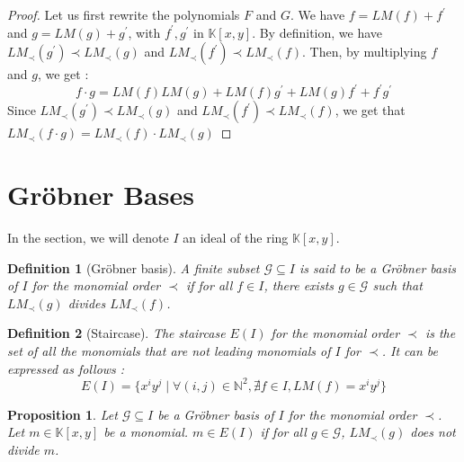 \documentclass{article}
\newtheorem{definition}{Definition}[section]
\newtheorem{proposition}{Proposition}[section]
\begin{document}
\begin{proof}
    Let us first rewrite the polynomials $F$ and $G$. We have $f = LM(f) + f^{\prime}$ and $g = LM(g) + g^{\prime}$, with $f^{\prime}, g^{\prime}$ in $\mathbb{K}[x, y]$. By definition, we have  $LM_{\prec}(g^{\prime}) \prec LM_{\prec}(g)$ and $LM_{\prec}(f^{\prime}) \prec LM_{\prec}(f)$. Then, by multiplying $f$ and $g$, we get :
    \begin{displaymath}
        f \cdot g = LM(f)LM(g) + LM(f)g^{\prime} + LM(g)f^{\prime} + f^{\prime}g^{\prime}
    \end{displaymath}
    Since $LM_{\prec}(g^{\prime}) \prec LM_{\prec}(g)$ and $LM_{\prec}(f^{\prime}) \prec LM_{\prec}(f)$, we get that $LM_{\prec}(f \cdot g) = LM_{\prec}(f) \cdot LM_{\prec}(g)$ 
\end{proof}

\section{Gröbner Bases}

In the section, we will denote $I$ an ideal of the ring $\mathbb{K}[x, y]$. 


\begin{definition}[Gröbner basis]
    A finite subset $\mathscr{G} \subseteq I$ is said to be a Gröbner basis of $I$ for the monomial order $\prec$ if for all $f \in I$, there exists $g \in \mathscr{G}$ such that $LM_{\prec}(g)$ divides $LM_{\prec}(f)$. 
\end{definition}

\begin{definition}[Staircase]
    The staircase $E(I)$ for the monomial order $\prec$ is the set of all the monomials that are not leading monomials of $I$ for $\prec$. It can be expressed as follows : 
    \begin{displaymath}
        E(I) = \{ x^{i}y^{j} \mid \forall (i, j) \in \mathbb{N}^{2}, \nexists f \in I, LM(f) = x^{i}y^{j}\}
    \end{displaymath}
\end{definition}

\begin{proposition} \label{proposition:monomial-in-staircase}
    Let $\mathscr{G} \subseteq I$ be a Gröbner basis of $I$ for the monomial order $\prec$. Let $m \in \mathbb{K}[x,y]$ be a monomial. $m \in E(I)$ if for all $g \in \mathscr{G}$, $LM_{\prec}(g)$ does not divide $m$.
\end{proposition}
\end{document}
